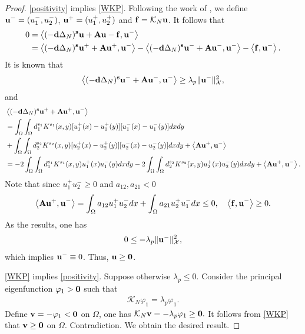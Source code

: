 \documentclass[a4paper,11pt]{amsart}
\theoremstyle{definition}
\def\O{\Omega}
\numberwithin{equation}{section}
\theoremstyle{definition}
\def\O{\Omega}
\begin{document}
\begin{proof} \ref{positivity} implies \ref{WKP}. Following the work of \cite[Theorem 2.1]{zhao_principal_2021}, we define ${\bf u}^-=(u_1^-,u_2^-)$, ${\bf u}^+=(u_1^+,u_2^+)$ and ${\bf f}=\mathcal{K}_N\textbf{u}$. It follows that
\begin{align*}
0&= \left<(-\textbf{d}\Delta_N)^{\textbf{s}}\textbf{u}+ {\bf Au}-{\bf f},{\bf u}^-\right>\\
&=\left<(-\textbf{d}\Delta_N)^{\textbf{s}}\textbf{u}^++{\bf A}{\bf u}^+, {\bf u}^-\right>-\left<(-\textbf{d}\Delta_N)^{\textbf{s}}\textbf{u}^-+{\bf A}{\bf u}^-, {\bf u}^-\right>-\left<{\bf f},{\bf u}^-\right>.
\end{align*}
It is known that
\begin{align*}
\left<(-\textbf{d}\Delta_N)^{\textbf{s}}\textbf{u}^- + {\bf A}{\bf u}^-,{\bf u}^-\right>\geq \lambda_p\|{\bf u}^-\|_{\mathcal{X}}^2,
\end{align*}
and
\begin{align*}
&\left<(-\textbf{d}\Delta_N)^{\textbf{s}}\textbf{u}^+ + {\bf A}{\bf u}^+,{\bf u}^-\right>\\
&=\int_{\O}\int_{\O}d_1^{s_1}K^{s_1}(x,y)[u^+_1(x)-u^+_1(y)][u^-_1(x)-u^-_1(y)]dxdy\\
&+\int_{\O}\int_{\O}d_2^{s_2}K^{s_2}(x,y)[u^+_2(x)-u^+_2(y)][u^-_2(x)-u^-_2(y)]dxdy+\left<{\bf A}{\bf u}^+,{\bf u}^-\right>\\
&=-2\int_{\O}\int_{\O}d_1^{s_1}K^{s_1}(x,y)u^+_1(x)u^-_1(y)dxdy-2\int_{\O}\int_{\O}d_2^{s_2}K^{s_2}(x,y)u^+_2(x)u^-_2(y)dxdy+\left<{\bf A}{\bf u}^+,{\bf u}^-\right>.
\end{align*}
Note that since $u^+_1u^-_2\geq 0$ and $a_{12},a_{21}<0$
\begin{align*}
\left<{\bf A}{\bf u}^+,{\bf u}^-\right>=\int_{\O}a_{12}u_1^+u^-_2dx + \int_{\O}a_{21}u_2^+u^-_1dx\leq 0,\quad \left<{\bf f},{\bf u}^-\right>\geq 0.
\end{align*}
As the results, one has
\begin{align*}
0\leq -\lambda_p\|{\bf u}^-\|_{\mathcal{X}}^2,
\end{align*}
which implies ${\bf u}^-\equiv 0$. Thus, ${\bf u}\geq {\bf 0}$.


\ref{WKP} implies \ref{positivity}. Suppose otherwise $\lambda_p\leq 0$. Consider the principal eigenfunction $\varphi_1>{\bf 0}$ such that
\begin{align*}
\mathcal{K}_N\varphi_1=\lambda_p \varphi_1.
\end{align*}
Define ${\bf v} = -\varphi_1<{\bf 0}$ on $\O$, one has $\mathcal{K}_N{\bf v}=-\lambda_p \varphi_1\geq {\bf 0}.$ It follows from \ref{WKP} that ${\bf v} \geq {\bf 0}$ on $\O$. Contradiction. We obtain the desired result.

\end{proof}
\end{document}
